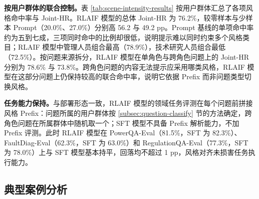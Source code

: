 \documentclass[fontset=fandol,type=master,campus=shenzhen,etitleauto=true]{hithesisbook}
\begin{document}
\textbf{按用户群体的联合控制。}表 \ref{tab:scene-intensity-results} 按用户群体汇总了各项风格命中率与 Joint-HR。RLAIF 模型的总体 Joint-HR 为 76.2\%，较零样本与少样本 Prompt（20.0\%、27.0\%）分别高 56.2 与 49.2 pp。Prompt 基线的单项命中率约为五到七成，三项同时命中的比例却很低，说明提示难以同时约束多个风格类目；RLAIF 模型中管理人员组合最高（78.9\%），技术研究人员组合最低（72.5\%）。按问题来源拆分，RLAIF 模型在单角色与跨角色问题上的 Joint-HR 分别为 78.6\% 与 73.8\%。跨角色问题的内容无法提示应采用哪类风格，RLAIF 模型在这部分问题上仍保持较高的联合命中率，说明它依据 Prefix 而非问题类型切换风格。

\begin{table}[htbp]
\centering
\caption{三类用户群体组合下的各项风格命中率与联合命中率（单位：\%）}
\label{tab:scene-intensity-results}
\small
\setlength{\tabcolsep}{6pt}
\renewcommand{\arraystretch}{1.15}
\end{table}

\textbf{任务能力保持。}与部署形态一致，RLAIF 模型的领域任务评测在每个问题前拼接风格 Prefix：问题所属的用户群体按 \ref{subsec:question-classify} 节的方法确定，跨角色问题在所属群体中随机取一个；SFT 模型不具备 Prefix 解析能力，不加 Prefix 评测。此时 RLAIF 模型在 PowerQA-Eval（81.5\%，SFT 为 82.3\%）、FaultDiag-Eval（62.3\%，SFT 为 63.0\%）和 RegulationQA-Eval（77.3\%，SFT 为 78.0\%）上与 SFT 模型基本持平，回落均不超过 1 pp，风格对齐未损害任务执行能力。

\subsection{典型案例分析}\label{subsec:style-case}
\end{document}
